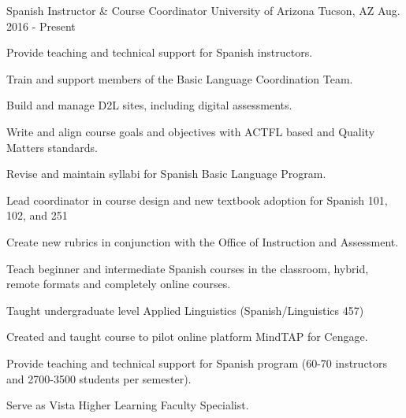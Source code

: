 


\begin{cventries}


\cventry
{Spanish Instructor \& Course Coordinator} %
{University of Arizona} %
{Tucson, AZ} %
{Aug. 2016 - Present} %
{ %
\begin{cvitems}
\item {Provide teaching and technical support for Spanish instructors.}
\item {Train and support members of the Basic Language Coordination Team.}
\item {Build and manage D2L sites, including digital assessments.}
\item {Write and align course goals and objectives with ACTFL based and Quality Matters standards.}
\item {Revise and maintain syllabi for Spanish Basic Language Program.}
\item {Lead coordinator in course design and new textbook adoption for Spanish 101, 102, and 251}
\item {Create new rubrics in conjunction with the Office of Instruction and Assessment.}
\item {Teach beginner and intermediate Spanish courses in the classroom, hybrid, remote formats and completely online courses.}
\item {Taught undergraduate level Applied Linguistics (Spanish/Linguistics 457)} 
\item {Created and taught course to pilot online platform MindTAP for Cengage.}
\item {Provide teaching and technical support for Spanish program (60-70 instructors and 2700-3500 students per semester).}
\item {Serve as Vista Higher Learning Faculty Specialist.}
\end{cvitems}
}


\end{cventries}
